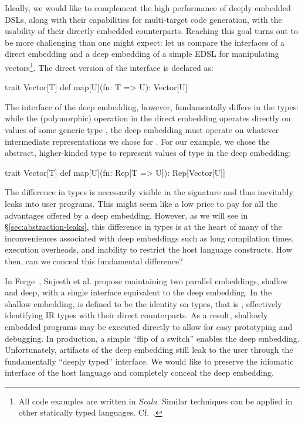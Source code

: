 Ideally, we would like to complement the high performance of deeply
embedded DSLs, along with their capabilities for multi-target code
generation, with the usability of their directly embedded counterparts.
Reaching this goal turns out to be more challenging than one might expect:
let us compare the interfaces of a direct embedding and a deep embedding of a simple
EDSL for manipulating vectors\footnote{
  All code examples are written in \emph{Scala}. Similar techniques can
  be applied in other statically typed languages.  Cf.~\cite{carette_finally_2009,awesome,svenningsson_combining_2012}.}.
The direct version of the interface is declared as:\begin{lstparagraph}
trait Vector[T] {
  def map[U](fn: T => U): Vector[U]
}
\end{lstparagraph}

The interface of the deep embedding, however,
fundamentally differs in the types: while the (polymorphic) 
operation in the direct embedding operates directly on values of some
generic type , the deep embedding must operate on whatever
intermediate representations we chose for . For our example,
we chose the abstract, higher-kinded type  to represent
values of type  in the deep embedding:\begin{lstparagraph}
trait Vector[T] {
  def map[U](fn: Rep[T => U]): Rep[Vector[U]]
}
\end{lstparagraph}

The difference in types is necessarily visible in the
signature and thus inevitably leaks into user programs. This might seem like
a low price to pay for all the advantages offered by a deep embedding.
However, as we will see in \S \ref{sec:abstraction-leaks}, this
difference in types is at the heart of many of the inconveniences
associated with deep embeddings such as long compilation times, execution overheads,
and inability to restrict the host language constructs. How then, can we conceal
this fundamental difference?

In Forge~\cite{forge}, Sujeeth et al. propose maintaining two parallel
embeddings, shallow and deep, with a single interface equivalent to
the deep embedding.  In the shallow embedding,  is defined
to be the identity on types, that is , effectively
identifying IR types with their direct counterparts.  As a result,
shallowly embedded programs may be executed directly to allow for easy
prototyping and debugging.  In production, a simple ``flip of a switch''
enables the deep embedding.  Unfortunately, artifacts of the deep
embedding still leak to the user through the fundamentally ``deeply
typed'' interface. We would like to preserve the idiomatic interface
of the host language and completely conceal the deep embedding.

